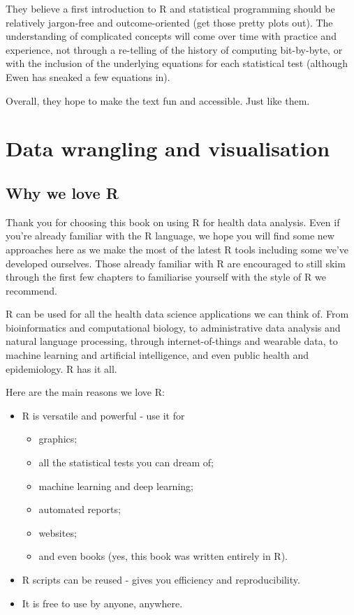 \documentclass[
  12pt,
  krantz2]{krantz}
\providecommand{\tightlist}{%
  \setlength{\itemsep}{0pt}\setlength{\parskip}{0pt}}
\begin{document}
They believe a first introduction to R and statistical programming should be relatively jargon-free and outcome-oriented (get those pretty plots out).
The understanding of complicated concepts will come over time with practice and experience, not through a re-telling of the history of computing bit-by-byte, or with the inclusion of the underlying equations for each statistical test (although Ewen has sneaked a few equations in).

Overall, they hope to make the text fun and accessible.
Just like them.

\mainmatter

\hypertarget{part-data-wrangling-and-visualisation}{%
\part{Data wrangling and visualisation}\label{part-data-wrangling-and-visualisation}}

\hypertarget{why-we-love-r}{%
\chapter{Why we love R}\label{why-we-love-r}}

Thank you for choosing this book on using R for health data analysis.
Even if you're already familiar with the R language, we hope you will find some new approaches here as we make the most of the latest R tools including some we've developed ourselves.
Those already familiar with R are encouraged to still skim through the first few chapters to familiarise yourself with the style of R we recommend.

R can be used for all the health data science applications we can think of.
From bioinformatics and computational biology, to administrative data analysis and natural language processing, through internet-of-things and wearable data, to machine learning and artificial intelligence, and even public health and epidemiology.
R has it all.

Here are the main reasons we love R:

\begin{itemize}
\tightlist
\item
  R is versatile and powerful - use it for

  \begin{itemize}
  \tightlist
  \item
    graphics;
  \item
    all the statistical tests you can dream of;
  \item
    machine learning and deep learning;
  \item
    automated reports;
  \item
    websites;
  \item
    and even books (yes, this book was written entirely in R).
  \end{itemize}
\item
  R scripts can be reused - gives you efficiency and reproducibility.
\item
  It is free to use by anyone, anywhere.
\end{itemize}
\end{document}
